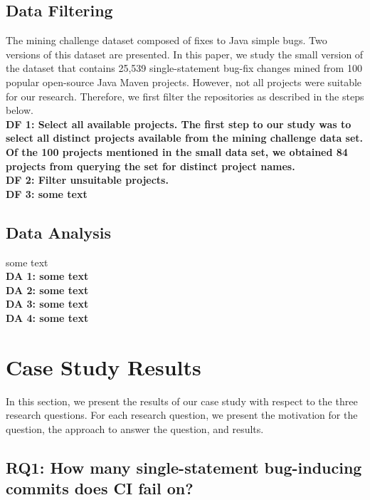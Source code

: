 \documentclass[10pt,conference]{IEEEtran}
\newcommand{\rqi}{RQ1:  How many single-statement bug-inducing commits does CI fail on?}
\begin{document}
\subsection{Data Filtering}
The mining challenge dataset composed of fixes to Java simple bugs. Two versions of this dataset are presented. In this paper, we study the small version of the dataset that contains 25,539 single-statement bug-fix changes mined from 100 popular open-source Java Maven projects. However, not all projects were suitable for our research. Therefore, we first filter the repositories as described in the steps below. \\ 
\textbf{DF 1: Select all available projects. The first step to our study was to select all distinct projects available from the mining challenge data set. Of the 100 projects mentioned in the small data set, we obtained 84 projects from querying the set for distinct project names. \\}
\textbf{DF 2: Filter unsuitable projects. \\}
\textbf{DF 3: some text \\}

\subsection{Data Analysis}
some text \\
\textbf{DA 1: some text \\}
\textbf{DA 2: some text \\}
\textbf{DA 3: some text \\}
\textbf{DA 4: some text \\}

\section{Case Study Results}
In this section, we present the results of our case study with respect to the three research questions. For each research question, we present the motivation for the question, the approach to answer the question, and results.

\subsection*{\rqi}
\end{document}
